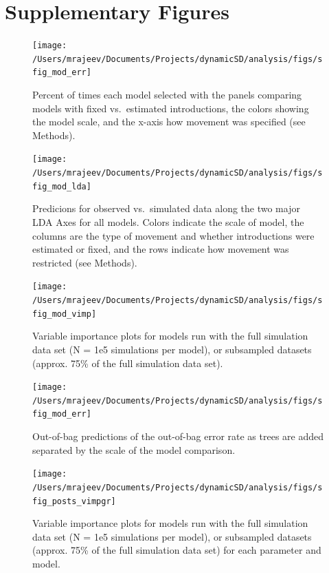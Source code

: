 \documentclass[
]{book}
\newcommand{\beginsupplement}{
  \setcounter{table}{0}  
  \renewcommand{\thetable}{S\arabic{table}} 
  \setcounter{figure}{0} 
  \renewcommand{\thefigure}{S\arabic{figure}}
}
\begin{document}
\newpage

\hypertarget{supplementary-figures-1}{%
\section{Supplementary Figures}\label{supplementary-figures-1}}

\beginsupplement

\begin{figure}
\texttt{[image: /Users/mrajeev/Documents/Projects/dynamicSD/analysis/figs/sfig\_mod\_err]} \caption{Percent of times each model selected with the panels comparing models with fixed vs.~estimated introductions, the colors showing the model scale, and the x-axis how movement was specified (see Methods).}\label{fig:sfig-mod-ranks}
\end{figure}



\begin{figure}
\texttt{[image: /Users/mrajeev/Documents/Projects/dynamicSD/analysis/figs/sfig\_mod\_lda]} \caption{Predicions for observed vs.~simulated data along the two major LDA Axes for all models. Colors indicate the scale of model, the columns are the type of movement and whether introductions were estimated or fixed, and the rows indicate how movement was restricted (see Methods).}\label{fig:sfig-mod-lda}
\end{figure}



\begin{figure}
\texttt{[image: /Users/mrajeev/Documents/Projects/dynamicSD/analysis/figs/sfig\_mod\_vimp]} \caption{Variable importance plots for models run with the full simulation data set (N = 1e5 simulations per model), or subsampled datasets (approx. 75\% of the full simulation data set).}\label{fig:sfig-mod-vimp}
\end{figure}



\begin{figure}
\texttt{[image: /Users/mrajeev/Documents/Projects/dynamicSD/analysis/figs/sfig\_mod\_err]} \caption{Out-of-bag predictions of the out-of-bag error rate as trees are added separated by the scale of the model comparison.}\label{fig:sfig-mod-err}
\end{figure}



\begin{figure}
\texttt{[image: /Users/mrajeev/Documents/Projects/dynamicSD/analysis/figs/sfig\_posts\_vimpgr]} \caption{Variable importance plots for models run with the full simulation data set (N = 1e5 simulations per model), or subsampled datasets (approx. 75\% of the full simulation data set) for each parameter and model.}\label{fig:sfig-posts-vimp}
\end{figure}
\end{document}
